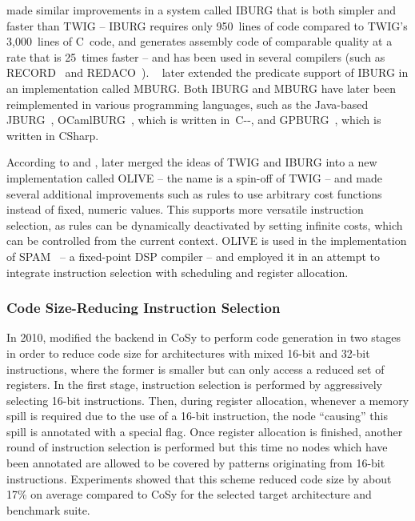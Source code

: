 {\textcite{Fraser1992a} made similar improvements in a system called \gls{IBURG}
that is both simpler and faster than \gls{TWIG} -- \gls{IBURG} requires only
950~lines of code compared to \gls{TWIG}'s \mbox{3,000 lines} of \gls{C}~code,
and generates \gls{assembly code} of comparable quality at a rate that is
25~times faster -- and has been used in several \glspl{compiler} (such as
\gls{RECORD}~\cite{Leupers1997, Marwedel1997} and
\gls{REDACO}~\cite{Kreuzer1996}).
%
\citeauthor{Gough1997}~\cite{Gough1995,
  Gough1997} later extended the \gls{predicate} support of \gls{IBURG} in an
implementation called \gls{MBURG}.
%
Both \gls{IBURG} and \gls{MBURG} have later
been reimplemented in various programming languages, such as the
\gls{Java}-based \gls{JBURG}~\cite{JBURG}, \gls{OCamlBURG}~\cite{OCamlBURG},
which is written in~\gls{C--}, and \gls{GPBURG}~\cite{Gough2012}, which is
written in \gls{CSharp}.

According to \textcite{Leupers2001} and \textcite{Cao2011},
\textcite{Tjiang1993} later merged the ideas of \gls{TWIG} and \gls{IBURG} into
a new implementation called \gls{OLIVE} -- the name is a spin-off of
\gls{TWIG} -- and made several additional improvements such as \glspl{rule} to
use arbitrary cost functions instead of fixed, numeric values.
%
This supports
more versatile \gls{instruction selection}, as \glspl{rule} can be dynamically
deactivated by setting infinite costs, which can be controlled from the current
context.
%
\gls{OLIVE} is used in the implementation of
\gls{SPAM}~\cite{Sudarsanam1999} -- a fixed-point \gls{DSP} \gls{compiler} -- and
\textcite{Araujo1995} employed it in an attempt to integrate \gls{instruction
  selection} with scheduling and \gls{register allocation}.


\subsubsection{Code Size-Reducing Instruction Selection}

In 2010, \textcite{EdlerVonKoch2010} modified the backend in \gls{CoSy} to
perform \gls{code generation} in two stages in order to reduce code size for
architectures with mixed \mbox{16-bit} and \mbox{32-bit} \glspl{instruction},
where the former is smaller but can only access a reduced set of
\glspl{register}.
%
In the first stage, \gls{instruction selection} is performed
by aggressively selecting \mbox{16-bit} \glspl{instruction}.
%
Then, during
\gls{register allocation}, whenever a memory spill is required due to the use of
a \mbox{16-bit} \gls{instruction}, the \gls{node} ``causing'' this spill is
annotated with a special flag.
%
Once \gls{register allocation} is finished,
another round of \gls{instruction selection} is performed but this time no
\glspl{node} which have been annotated are allowed to be covered by
\glspl{pattern} originating from \mbox{16-bit} \glspl{instruction}.
%
Experiments
showed that this scheme reduced code size by about 17\% on average compared to
\gls{CoSy} for the selected target architecture and benchmark suite.


}
